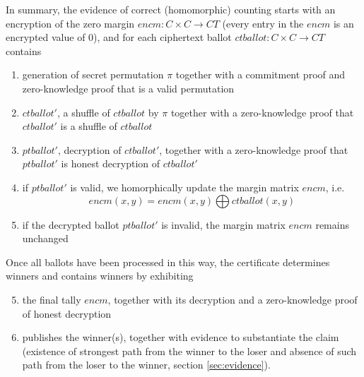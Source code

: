 In summary, the evidence of correct (homomorphic) counting starts
with an encryption of the zero margin $encm : C \times C \to CT$ (every entry in 
the $encm$ is an encrypted value of 0), and for each
ciphertext ballot $ctballot : C \times C \to CT $ contains
\begin{enumerate}
\item generation of secret permutation $\pi$  together with a commitment proof and zero-knowledge proof that is a valid permutation
\item \label{it:shuff} $ctballot'$, a shuffle of $ctballot$ by $\pi$ together with a zero-knowledge proof that $ctballot'$ is a shuffle of $ctballot$
\item $ptballot'$, decryption of $ctballot'$, together with a zero-knowledge proof that  $ptballot'$ is  honest decryption of $ctballot'$
\item \label{it:upd-marg}  if $ptballot'$ is valid,  we homorphically  update the margin matrix $encm$,  i.e.   \[ encm(x, y) = encm(x, y) \bigoplus  ctballot(x, y) \]
\item  if the decrypted ballot $ptballot'$ is invalid,  the margin matrix $encm$ remains unchanged
\setcounter{mycnt}{\value{enumi}}
\end{enumerate}
Once all ballots have been processed in this way, the certificate
determines winners and contains
winners by exhibiting
\begin{enumerate}
\setcounter{enumi}{4}
\item \label{it:pub-dm} the final tally $encm$, together with its decryption  
  and a zero-knowledge proof of honest decryption     
\item publishes the winner(s), together with evidence to substantiate the claim (existence of strongest path from the winner to the loser 
and absence of such path from the loser to the winner,  section \ref{sec:evidence}).
\end{enumerate}

